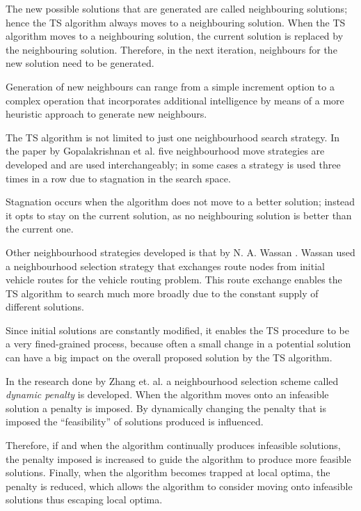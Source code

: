The new possible solutions that are generated are called neighbouring solutions; hence the TS algorithm always moves to a neighbouring solution. When the TS algorithm moves to a neighbouring solution, the current solution is replaced by the neighbouring solution. Therefore, in the next iteration, neighbours for the new solution need to be generated.

Generation of new neighbours can range from a simple increment option to a complex operation that incorporates additional intelligence by means of a more heuristic approach to generate new neighbours.

The TS algorithm is not limited to just one neighbourhood search strategy. In the paper by Gopalakrishnan et al.\cite{TabuCarryOver} five neighbourhood move strategies are developed and are used interchangeably; in some cases a strategy is used three times in a row due to stagnation in the search space. 

Stagnation occurs when the algorithm does not move to a better solution; instead it opts to stay on the current solution, as no neighbouring solution is better than the current one. 

Other neighbourhood strategies developed is that by N. A. Wassan \cite{ReactiveTabuVHR}. Wassan used a neighbourhood selection strategy that exchanges route nodes from initial vehicle routes for the vehicle routing problem. This route exchange enables the TS algorithm to search much more broadly due to the constant supply of different solutions. 

Since initial solutions are constantly modified, it enables the TS procedure to be a very fined-grained process, because often a small change in a potential solution can have a big impact on the overall proposed solution by the TS algorithm.

In the research done by Zhang et. al.\cite{TSHazardous} a neighbourhood selection scheme called \emph{dynamic penalty} is developed. When the algorithm moves onto an infeasible solution a penalty is imposed. By dynamically changing the penalty that is imposed the ``feasibility'' of solutions produced is influenced. 

Therefore, if and when the algorithm continually produces infeasible solutions, the penalty imposed is increased to guide the algorithm to produce more feasible solutions. Finally, when the algorithm becomes trapped at local optima, the penalty is reduced, which allows the algorithm to consider moving onto infeasible solutions thus escaping local optima.

